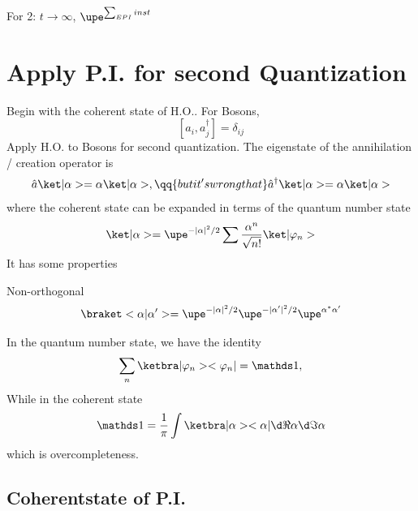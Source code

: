 For 2: $t\to \infty$, $\upe^{\sum_{EPI}inst}$

\newpage

\section{Apply P.I. for second Quantization}

Begin with the coherent state of H.O..
For Bosons,
\[
  [a_i, a_j^\dagger] = \delta_{ij}
\]
Apply H.O. to Bosons for second quantization.
The eigenstate of the annihilation / creation operator is
\[
  \hat a \ket|\alpha> = \alpha \ket|\alpha>, \qq{but it's wrong that}
  \hat a^\dagger \ket|\alpha> = \alpha \ket|\alpha>
\]
where the coherent state can be expanded in terms of the quantum number state
\[
  \ket|\alpha> = \upe^{-|\alpha|^2/2} \sum \frac{\alpha^n}{\sqrt{n!}} \ket|\varphi_n>
\]
It has some properties
\begin{enumext}
  \item Non-orthogonal
  \begin{equation}
    \braket<\alpha|\alpha'> = \upe^{-|\alpha|^2/2} \upe^{-|\alpha'|^2/2} \upe^{\alpha^*\alpha'}
  \end{equation}
  \item In the quantum number state, we have the identity
  \[
    \sum_n \ketbra|\varphi_n><\varphi_n| = \identity,
  \]
  While in the coherent state
  \begin{equation}
    \identity = \frac1\pi \int\ketbra|\alpha><\alpha| \d \Re\alpha \d \Im\alpha
  \end{equation}
  which is overcompleteness.
\end{enumext}

\subsection{Coherentstate of P.I.}

